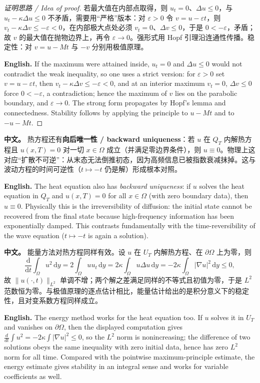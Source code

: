 \documentclass[UTF8,11pt,a4paper]{ctexart}
\newcommand{\APS}[2]{\par\noindent\textbf{中文。} #1\par\noindent\textbf{English.} #2\par\smallskip}
\newcommand{\EN}[1]{\par\noindent \textbf{English.} #1\par}
\newcommand{\dd}{\mathrm{d}}
\begin{document}
\begin{proof}[证明思路 / Idea of proof]
若最大值在内部点取得，则 $u_t=0$、$\Delta u\le0$，与 $u_t-\kappa\Delta u\le0$ 不矛盾，需要用``严格''版本：对 $\varepsilon>0$ 令 $v=u-\varepsilon t$，则 $v_t-\kappa\Delta v\le-\varepsilon<0$，在内部极大点处必须 $v_t=0$、$\Delta v\le0$，于是 $0<-\varepsilon$，矛盾；故 $v$ 的最大值在抛物边界上，再令 $\varepsilon\to0$。强形式用 Hopf 引理沿连通性传播。稳定性：对 $v=u-Mt$ 与 $-v$ 分别用极值原理。\EN{If the maximum were attained inside, $u_t=0$ and $\Delta u\le0$ would not contradict the weak inequality, so one uses a strict version: for $\varepsilon>0$ set $v=u-\varepsilon t$, then $v_t-\kappa\Delta v\le-\varepsilon<0$, and at an interior maximum $v_t=0$, $\Delta v\le0$ force $0<-\varepsilon$, a contradiction; hence the maximum of $v$ lies on the parabolic boundary, and $\varepsilon\to0$. The strong form propagates by Hopf's lemma and connectedness. Stability follows by applying the principle to $u-Mt$ and to $-u-Mt$.}
\end{proof}

\APS{热方程还有\textbf{向后唯一性 / backward uniqueness}：若 $u$ 在 $Q_T$ 内解热方程且 $u(x,T)=0$ 对一切 $x\in\Omega$ 成立（并满足零边界条件），则 $u\equiv0$。物理上这对应``扩散不可逆''：从末态无法倒推初态，因为高频信息已被指数衰减抹掉。这与波动方程的时间可逆性（$t\mapsto-t$ 仍是解）形成根本对照。}{The heat equation also has \emph{backward uniqueness}: if $u$ solves the heat equation in $Q_T$ and $u(x,T)=0$ for all $x\in\Omega$ (with zero boundary data), then $u\equiv0$. Physically this is the irreversibility of diffusion: the initial state cannot be recovered from the final state because high-frequency information has been exponentially damped. This contrasts fundamentally with the time-reversibility of the wave equation ($t\mapsto-t$ is again a solution).}

\APS{能量方法对热方程同样有效。设 $u$ 在 $U_T$ 内解热方程、在 $\partial\Omega$ 上为零，则
\[
\frac{\dd}{\dd t}\int_\Omega u^2\,\dd y=2\int_\Omega uu_t\,\dd y=2\kappa\int_\Omega u\Delta u\,\dd y=-2\kappa\int_\Omega|\nabla u|^2\,\dd y\le0,
\]
故 $\|u(\cdot,t)\|_{L^2}$ 单调不增；两个解之差满足同样的不等式且初值为零，于是 $L^2$ 范数恒为零。与极值原理的逐点估计相比，能量估计给出的是积分意义下的稳定性，且对变系数方程同样成立。}{The energy method works for the heat equation too. If $u$ solves it in $U_T$ and vanishes on $\partial\Omega$, then the displayed computation gives $\frac{d}{dt}\int u^2=-2\kappa\int|\nabla u|^2\le0$, so the $L^2$ norm is nonincreasing; the difference of two solutions obeys the same inequality with zero initial data, hence has zero $L^2$ norm for all time. Compared with the pointwise maximum-principle estimate, the energy estimate gives stability in an integral sense and works for variable coefficients as well.}
\end{document}
